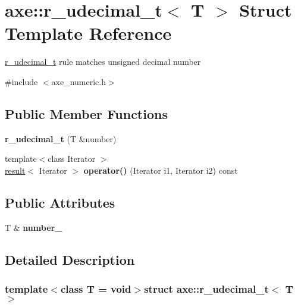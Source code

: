 \hypertarget{structaxe_1_1r__udecimal__t}{\section{axe\+:\+:r\+\_\+udecimal\+\_\+t$<$ T $>$ Struct Template Reference}
\label{structaxe_1_1r__udecimal__t}
}


\hyperlink{structaxe_1_1r__udecimal__t}{r\+\_\+udecimal\+\_\+t} rule matches unsigned decimal number  




{\ttfamily \#include $<$axe\+\_\+numeric.\+h$>$}

\subsection*{Public Member Functions}
\begin{DoxyCompactItemize}
\item 
\hypertarget{structaxe_1_1r__udecimal__t_a1caa81b7881b9affb6ea4d6f220656e0}{{\bfseries r\+\_\+udecimal\+\_\+t} (T \&number)}\label{structaxe_1_1r__udecimal__t_a1caa81b7881b9affb6ea4d6f220656e0}

\item 
\hypertarget{structaxe_1_1r__udecimal__t_a2ed0756a10cdc44634ac8dc3028d9ff1}{{\footnotesize template$<$class Iterator $>$ }\\\hyperlink{structaxe_1_1result}{result}$<$ Iterator $>$ {\bfseries operator()} (Iterator i1, Iterator i2) const }\label{structaxe_1_1r__udecimal__t_a2ed0756a10cdc44634ac8dc3028d9ff1}

\end{DoxyCompactItemize}
\subsection*{Public Attributes}
\begin{DoxyCompactItemize}
\item 
\hypertarget{structaxe_1_1r__udecimal__t_a699b7c73463be39c078dcbecfbcab4ac}{T \& {\bfseries number\+\_\+}}\label{structaxe_1_1r__udecimal__t_a699b7c73463be39c078dcbecfbcab4ac}

\end{DoxyCompactItemize}


\subsection{Detailed Description}
\subsubsection*{template$<$class T = void$>$struct axe\+::r\+\_\+udecimal\+\_\+t$<$ T $>$}

